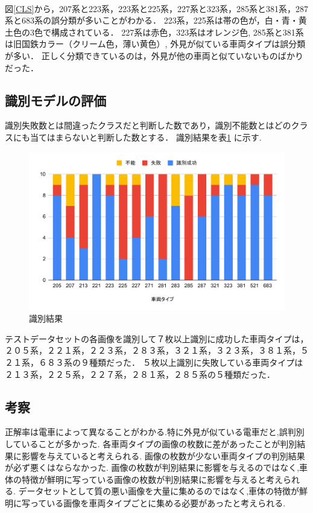 \\
図\ref{CLS}から，207系と223系，223系と225系，227系と323系，285系と381系，287系と683系の誤分類が多いことがわかる．
223系，225系は帯の色が，白・青・黄土色の3色で構成されている．
227系は赤色，323系はオレンジ色,
285系と381系は旧国鉄カラー（クリーム色，薄い黄色）,
外見が似ている車両タイプは誤分類が多い．
正しく分類できているのは，外見が他の車両と似ていないものばかりだった．



\subsection{識別モデルの評価}
識別失敗数とは間違ったクラスだと判断した数であり，識別不能数とはどのクラスにも当てはまらないと判断した数とする．
識別結果を表\ref{fig:chartdet} に示す.\\
\begin{figure}[H]
	\centering
	\includegraphics[width=0.7\linewidth]{chap4/fig/chartDET}
	\caption[識別結果]{識別結果}
	\label{fig:chartdet}
\end{figure}


テストデータセットの各画像を識別して７枚以上識別に成功した車両タイプは，２０５系，２２１系，２２３系，２８３系，３２１系，３２３系，３８１系，５２１系，６８３系の９種類だった．
５枚以上識別に失敗している車両タイプは２１３系，２２５系，２２７系，２８１系，２８５系の５種類だった．

\subsection{考察}
正解率は電車によって異なることがわかる.特に外見が似ている電車だと,誤判別していることが多かった.
各車両タイプの画像の枚数に差があったことが判別結果に影響を与えていると考えられる.
画像の枚数が少ない車両タイプの判別結果が必ず悪くはならなかった.
画像の枚数が判別結果に影響を与えるのではなく,車体の特徴が鮮明に写っている画像の枚数が判別結果に影響を与えると考えられる.
データセットとして質の悪い画像を大量に集めるのではなく,車体の特徴が鮮明に写っている画像を車両タイプごとに集める必要があったと考えられる.

